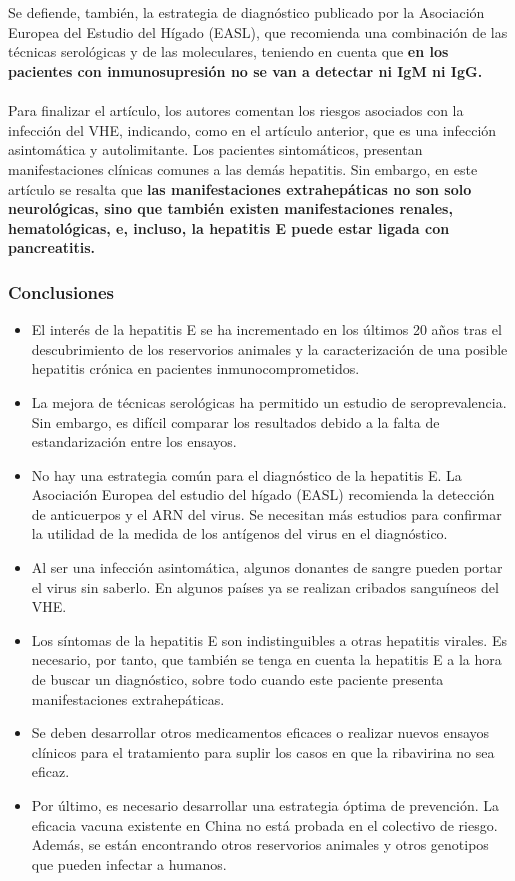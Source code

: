 \documentclass[11 pt]{article}
\begin{document}
\\\\Se defiende, también, la estrategia de diagnóstico publicado por la Asociación Europea del Estudio del Hígado (EASL), que recomienda una combinación de las técnicas serológicas y de las moleculares, teniendo en cuenta que {\bf en los pacientes con inmunosupresión no se van a detectar ni IgM ni IgG.}\\\\
Para finalizar el artículo, los autores comentan los riesgos asociados con la infección del VHE, indicando, como en el artículo anterior, que es una infección asintomática y autolimitante. Los pacientes sintomáticos, presentan manifestaciones clínicas comunes a las demás hepatitis. Sin embargo, en este artículo se resalta que {\bf las manifestaciones extrahepáticas no son solo neurológicas, sino que también existen manifestaciones renales, hematológicas, e, incluso, la hepatitis E puede estar ligada con pancreatitis.}
\subsubsection{Conclusiones}
\begin{itemize}
	\item El interés de la hepatitis E se ha incrementado en los últimos 20 años tras el descubrimiento de los reservorios animales y la caracterización de una posible hepatitis crónica en pacientes inmunocomprometidos.
	\item La mejora de técnicas serológicas ha permitido un estudio de seroprevalencia. Sin embargo, es difícil comparar los resultados debido a la falta de estandarización entre los ensayos.
	\item No hay una estrategia común para el diagnóstico de la hepatitis E. La Asociación Europea del estudio del hígado (EASL) recomienda la detección de anticuerpos y el ARN del virus. Se necesitan más estudios para confirmar la utilidad de la medida de los antígenos del virus en el diagnóstico.
	\item Al ser una infección asintomática, algunos donantes de sangre pueden portar el virus sin saberlo. En algunos países ya se realizan cribados sanguíneos del VHE. 
	\item Los síntomas de la hepatitis E son indistinguibles a otras hepatitis virales. Es necesario, por tanto, que también se tenga en cuenta la hepatitis E a la hora de buscar un diagnóstico, sobre todo cuando este paciente presenta manifestaciones extrahepáticas. 
	\item Se deben desarrollar otros medicamentos eficaces o realizar nuevos ensayos clínicos para el tratamiento para suplir los casos en que la ribavirina no sea eficaz.
	\item Por último, es necesario desarrollar una estrategia óptima de prevención. La eficacia vacuna existente en China no está probada en el colectivo de riesgo. Además, se están encontrando otros reservorios animales y otros genotipos que pueden infectar a humanos.
\end{itemize}
\end{document}
